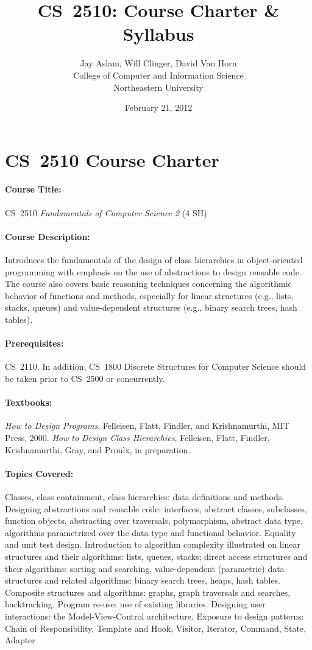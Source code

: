 \documentclass[11pt]{article}
\title{CS~2510: Course Charter \& Syllabus}
\author{Jay Aslam, Will Clinger, David Van Horn \\
        College of Computer and Information Science \\
        Northeastern University}
\date{February 21, 2012}
\begin{document}
\maketitle

\section{CS~2510 Course Charter}

\paragraph{Course Title:}
%
CS~2510 \emph{Fundamentals of Computer Science 2}	(4 SH)

\paragraph{Course Description:}
%
Introduces the fundamentals of the design of class hierarchies in object-oriented programming with emphasis on the use of abstractions to design reusable code. The course also covers basic reasoning techniques concerning the algorithmic behavior of functions and methods, especially for linear structures (e.g., lists, stacks, queues) and value-dependent structures (e.g., binary search trees, hash tables).

\paragraph{Prerequisites:}
%
CS~2110. In addition, CS~1800 Discrete Structures for Computer Science should be taken prior to CS~2500 or concurrently.

\paragraph{Textbooks:}
%
\emph{How to Design Programs}, Felleisen, Flatt, Findler, and Krishnamurthi, MIT Press, 2000. \emph{How to Design Class Hierarchies}, Felleisen, Flatt, Findler, Krishnamurthi, Gray, and Proulx, in preparation.

\paragraph{Topics Covered:}
%
Classes, class containment, class hierarchies: data definitions and methods.
%
Designing abstractions and reusable code: interfaces, abstract classes, subclasses, function objects, abstracting over traversals, polymorphism, abstract data type, algorithms parametrized over the data type and functional behavior. 
%
Equality and unit test design.
%
Introduction to algorithm complexity illustrated on linear structures and their algorithms: lists, queues, stacks; direct access structures and their algorithms: sorting and searching, value-dependent (parametric) data structures and related algorithms: binary search trees, heaps, hash tables.
%
Composite structures and algorithms: graphs, graph traversals and searches, backtracking.
%
Program re-use: use of existing libraries.
%
Designing user interactions: the Model-View-Control architecture.
%
Exposure to design patterns: Chain of Responsibility, Template and Hook, Visitor, Iterator, Command, State, Adapter
\end{document}
